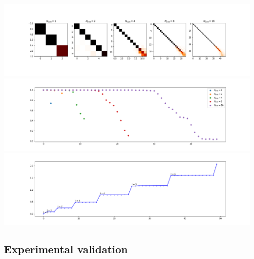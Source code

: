 \begin{minipage}{.5\textwidth}
	\centering
	\includegraphics[width=0.9\linewidth]{../codes/02.HeatKernelGraphLaplacian/HEALPix/06_figures/optimal_thresholded.png}
	\includegraphics[width=0.9\linewidth]{../codes/02.HeatKernelGraphLaplacian/HEALPix/06_figures/optimal_thresholded_diagonal.png}
	\includegraphics[width=0.9\linewidth]{../codes/02.HeatKernelGraphLaplacian/HEALPix/06_figures/optimal_thresholded_eigenvalues.png}
\end{minipage}

\subsection{Experimental validation}
\label{sec:Chapter2:Experimental validation}
